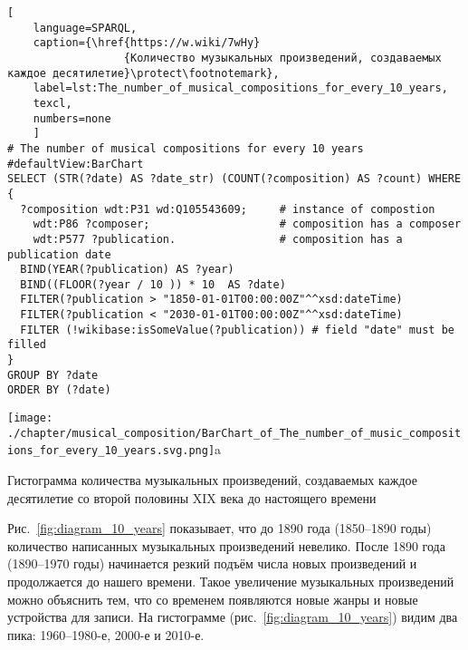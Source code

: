 \begin{lstlisting}[ 
    language=SPARQL,
    caption={\href{https://w.wiki/7wHy}
                  {Количество музыкальных произведений, создаваемых каждое десятилетие}\protect\footnotemark},
    label=lst:The_number_of_musical_compositions_for_every_10_years,
    texcl,
    numbers=none
    ]
# The number of musical compositions for every 10 years
#defaultView:BarChart
SELECT (STR(?date) AS ?date_str) (COUNT(?composition) AS ?count) WHERE {
  ?composition wdt:P31 wd:Q105543609;     # instance of compostion
    wdt:P86 ?composer;                    # composition has a composer
    wdt:P577 ?publication.                # composition has a publication date
  BIND(YEAR(?publication) AS ?year)
  BIND((FLOOR(?year / 10 )) * 10  AS ?date)
  FILTER(?publication > "1850-01-01T00:00:00Z"^^xsd:dateTime)
  FILTER(?publication < "2030-01-01T00:00:00Z"^^xsd:dateTime) 
  FILTER (!wikibase:isSomeValue(?publication)) # field "date" must be filled
}
GROUP BY ?date
ORDER BY (?date)
\end{lstlisting}%

\begin{marginfigure}[-5\baselineskip]
    \texttt{[image: ./chapter/musical\_composition/BarChart\_of\_The\_number\_of\_music\_compositions\_for\_every\_10\_years.svg.png]}a
    \vspace{-7pt}
	\caption{Гистограмма количества музыкальных произведений, 
             создаваемых каждое десятилетие со второй половины XIX века до настоящего времени}%
	\label{fig:diagram_10_years}%
\end{marginfigure}
%
Рис.~\ref{fig:diagram_10_years} показывает, что до 1890 года (1850--1890 годы) 
количество написанных музыкальных произведений невелико. 
После 1890 года (1890--1970 годы) начинается резкий подъём числа новых произведений 
и продолжается до нашего времени. 
Такое увеличение музыкальных произведений можно объяснить тем, 
что со временем появляются новые жанры и новые устройства для записи. 
На гистограмме (рис.~\ref{fig:diagram_10_years}) видим два пика: 1960--1980-е, 2000-е и 2010-е.







